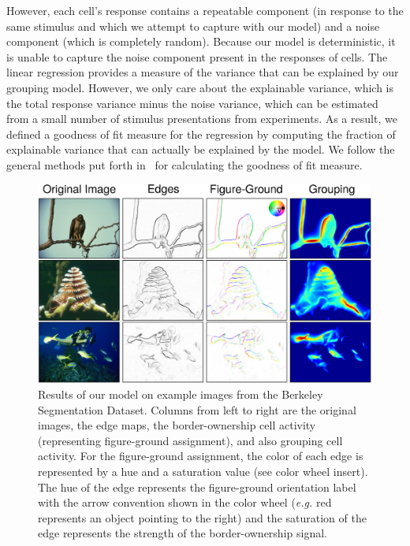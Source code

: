 \documentclass[12pt]{article}
\newcommand{\eg}[0]{{\em e.g.}\xspace}
\begin{document}
However, each cell's response contains a repeatable component (in response to the same stimulus and which we attempt to capture with our model) and a noise component (which is completely random). Because our model is deterministic, it is unable to capture the noise component present in the responses of cells. The linear regression provides a measure of the variance that can be explained by our grouping model. However, we only care about the explainable variance, which is the total response variance minus the noise variance, which can be estimated from a small number of stimulus presentations from experiments. As a result, we defined a goodness of fit measure for the regression by computing the fraction of explainable variance that can actually be explained by the model. We follow the general methods put forth in~\citet{DiCarlo_etal98} for calculating the goodness of fit measure.

\begin{figure}[t]
\hfill
\begin{center}
\includegraphics[width=\textwidth]{figs/results_new}
\end{center}
\caption{
Results of our model on example images from the Berkeley Segmentation Dataset. Columns from left to right are the original images, the edge maps, the border-ownership cell activity (representing figure-ground assignment), and also grouping cell activity. For the figure-ground assignment, the color of each edge is represented by a hue and a saturation value (see color wheel insert). The hue of the edge represents the figure-ground orientation label with the arrow convention shown in the color wheel (\eg red represents an object pointing to the right) and the saturation of the edge represents the strength of the border-ownership signal.}
\label{Fig:results_summary}
\end{figure}
\end{document}
